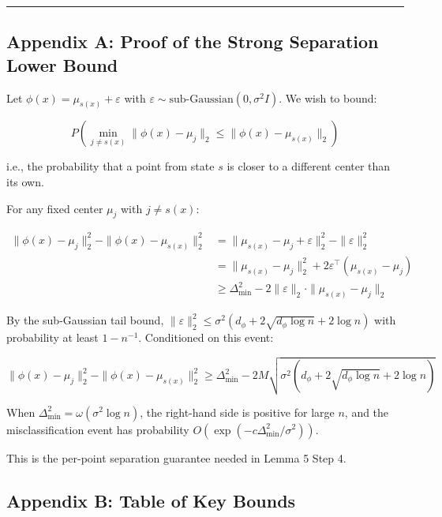 \documentclass[
  12pt,
]{article}
\begin{document}
\begin{center}\rule{0.5\linewidth}{0.5pt}\end{center}

\subsection{Appendix A: Proof of the Strong Separation Lower
Bound}\label{appendix-a-proof-of-the-strong-separation-lower-bound}

Let \(\phi(x) = \mu_{s(x)} + \varepsilon\) with
\(\varepsilon \sim \text{sub-Gaussian}(0, \sigma^2 I)\). We wish to
bound:

\[P\left(\min_{j \neq s(x)} \|\phi(x) - \mu_j\|_2 \leq \|\phi(x) - \mu_{s(x)}\|_2\right)\]

i.e., the probability that a point from state \(s\) is closer to a
different center than its own.

For any fixed center \(\mu_j\) with \(j \neq s(x)\):

\[\begin{aligned}
\|\phi(x) - \mu_j\|_2^2 - \|\phi(x) - \mu_{s(x)}\|_2^2
&= \|\mu_{s(x)} - \mu_j + \varepsilon\|_2^2 - \|\varepsilon\|_2^2 \\
&= \|\mu_{s(x)} - \mu_j\|_2^2 + 2\varepsilon^\top(\mu_{s(x)} - \mu_j) \\
&\geq \Delta_{\min}^2 - 2\|\varepsilon\|_2 \cdot \|\mu_{s(x)} - \mu_j\|_2
\end{aligned}\]

By the sub-Gaussian tail bound,
\(\|\varepsilon\|_2^2 \leq \sigma^2(d_\phi + 2\sqrt{d_\phi \log n} + 2\log n)\)
with probability at least \(1 - n^{-1}\). Conditioned on this event:

\[\|\phi(x) - \mu_j\|_2^2 - \|\phi(x) - \mu_{s(x)}\|_2^2 \geq \Delta_{\min}^2 - 2M\sqrt{\sigma^2(d_\phi + 2\sqrt{d_\phi \log n} + 2\log n)}\]

When \(\Delta_{\min}^2 = \omega(\sigma^2 \log n)\), the right-hand side
is positive for large \(n\), and the misclassification event has
probability \(O(\exp(-c\Delta_{\min}^2 / \sigma^2))\).

This is the per-point separation guarantee needed in Lemma 5 Step 4.

\subsection{Appendix B: Table of Key
Bounds}\label{appendix-b-table-of-key-bounds}
\end{document}
